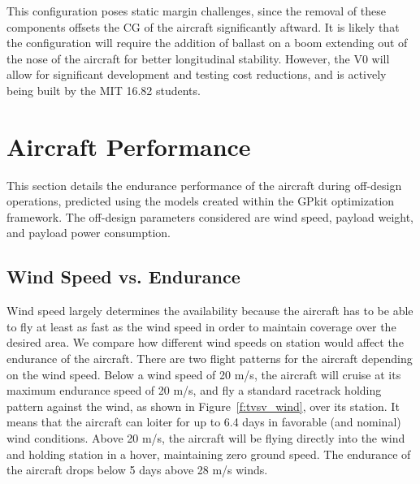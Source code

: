 \documentclass[journal]{aiaa-tc}%
\begin{document}
This configuration poses static margin challenges, since the removal of these components offsets the CG of the aircraft significantly aftward. It is likely that the configuration will require the addition of ballast on a boom extending out of the nose of the aircraft for better longitudinal stability. However, the V0 will allow for significant development and testing cost reductions, and is actively being built by the MIT 16.82 students. 

\section{Aircraft Performance}

This section details the endurance performance of the aircraft during off-design operations, predicted using the models created within the GPkit optimization framework. The off-design parameters considered are wind speed, payload weight, and payload power consumption. 

\subsection{Wind Speed vs. Endurance}
 Wind speed largely determines the availability because the aircraft has to be able to fly at least as fast as the wind speed in order to maintain coverage over the desired area. We compare how different wind speeds on station would affect the endurance of the aircraft. There are two flight patterns for the aircraft depending on the wind speed. Below a wind speed of 20 m/s, the aircraft will cruise at its maximum endurance speed of 20 m/s, and fly a standard racetrack holding pattern against the wind, as shown in Figure~\ref{f:tvsv_wind}, over its station. It means that the aircraft can loiter for up to 6.4 days in favorable (and nominal) wind conditions. Above 20 m/s, the aircraft will be flying directly into the wind and holding station in a hover, maintaining zero ground speed. The endurance of the aircraft drops below 5 days above 28 m/s winds.  
\end{document}
